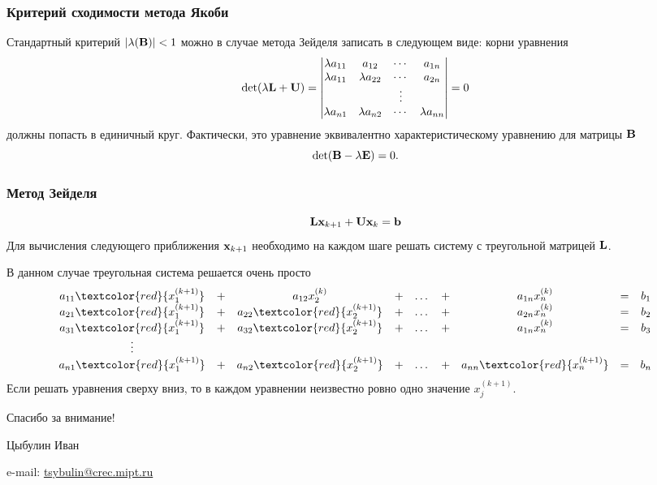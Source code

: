 \documentclass[apectratio=43,unicode]{beamer}
\newcommand{\colorhref}[2]{\href{#1}{\textcolor{miptbase!30!black}{#2}}}
\begin{document}
\begin{frame}\frametitle{Критерий сходимости метода Якоби}
	Стандартный критерий $|\lambda(\mathbf{B})| < 1$ можно в случае метода Зейделя
записать в следующем виде: корни уравнения
	\[
		\operatorname{det} (\lambda \mathbf{L} + \mathbf{U}) =
		\begin{vmatrix}
			\lambda a_{11} & a_{12} & \cdots & a_{1n}\\
			\lambda a_{11} & \lambda a_{22} & \cdots & a_{2n}\\
			&&\vdots\\
			\lambda a_{n1} & \lambda a_{n2} & \cdots & \lambda a_{nn}\\
		\end{vmatrix} = 0
	\]
	должны попасть в единичный круг. Фактически, это уравнение эквивалентно
характеристическому уравнению для матрицы $\mathbf{B}$
	\[
		\operatorname{det}(\mathbf{B} - \lambda \mathbf{E}) = 0.
	\]
\end{frame}

\begin{frame}\frametitle{Метод Зейделя}
	$$
	\mathbf{L} \mathbf{x}_{k+1} + \mathbf{U} \mathbf{x}_k = \mathbf{b}
	$$
	Для вычисления следующего приближения $\mathbf{x}_{k+1}$ необходимо на каждом шаге решать систему с треугольной матрицей $\mathbf{L}$. 

	В данном случае треугольная система решается очень просто
	\begin{equation*}
	\begin{array}{ccccccccc}
	a_{11} \textcolor{red}{x^{(k+1)}_{1}} &+& a_{12} x^{(k)}_{2}  &+& \dots &+& a_{1n} x^{(k)}_{n} &=& b_1\\
	a_{21} \textcolor{red}{x^{(k+1)}_{1}} &+& a_{22} \textcolor{red}{x^{(k+1)}_{2}} &+& \dots &+& a_{2n} x^{(k)}_{n} &=& b_2\\
	a_{31} \textcolor{red}{x^{(k+1)}_{1}} &+& a_{32}
\textcolor{red}{x^{(k+1)}_{2}} &+& \dots &+& a_{1n} x^{(k)}_{n} &=& b_3\\
	\vdots\\
	a_{n1} \textcolor{red}{x^{(k+1)}_{1}} &+& a_{n2}
\textcolor{red}{x^{(k+1)}_{2}} &+& \dots &+& a_{nn}
\textcolor{red}{x^{(k+1)}_{n}} &=& b_n
	\end{array}
	\end{equation*}
	Если решать уравнения сверху вниз, то в каждом уравнении неизвестно ровно
одно значение $x^{(k+1)}_{j}$.
\end{frame}
\begin{frame}[plain]
  \begin{center}
  {\Huge Спасибо за внимание!}
  \vspace{8ex}

  Цыбулин Иван

  e-mail: \colorhref{mailto:tsybulin@crec.mipt.ru}{tsybulin@crec.mipt.ru}
  \end{center}
\end{frame}
\end{document}
